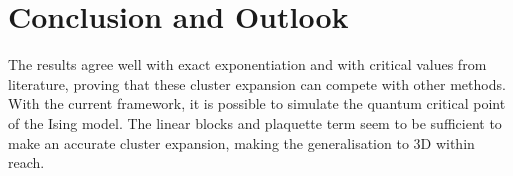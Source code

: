 \documentclass[twocolumn]{article}
\newcounter{a}
\newcounter{b}
\begin{document}
\section{Conclusion and Outlook}

The results agree well with exact exponentiation and with critical values from literature, proving that these cluster expansion can compete with other methods. With the current framework, it is possible to simulate the quantum critical point of the Ising model. The linear blocks and plaquette term seem to be sufficient to make an accurate cluster expansion, making the generalisation to 3D within reach.

\small


\end{document}
